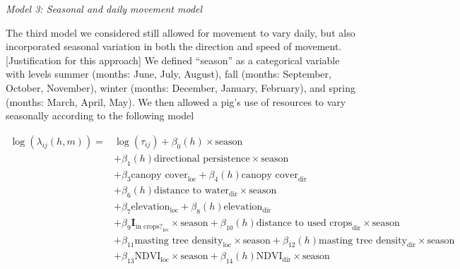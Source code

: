 \documentclass[a4paper]{article}
\begin{document}
\bigskip
\noindent
\emph{Model 3: Seasonal and daily movement model}

The third model we considered still allowed for movement to vary daily, but also incorporated seasonal variation in both the direction and speed of movement. [Justification for this approach] We defined ``season'' as a categorical variable with levels summer (months: June, July, August), fall (months: September, October, November), winter (months: December, January, February), and spring (months: March, April, May). We then allowed a pig's use of resources to vary seasonally according to the following model

\begin{align}
  \log(\lambda_{ij}(h, m)) = & \log(\tau_{ij}) + \beta_0(h) \times \text{season} \\
  & + \beta_1(h) \text{directional persistence} \times \text{season} \\
  & + \beta_{3} \text{canopy cover}_{\text{loc}} + \beta_{4}(h) \text{canopy cover}_{\text{dir}} \\
  & + \beta_6(h) \text{distance to water}_{\text{dir}} \times \text{season} \\
  & + \beta_7 \text{elevation}_{\text{loc}} + \beta_8(h) \text{elevation}_{\text{dir}} \\
  & + \beta_9\mathbf{I}_{\text{in crops?}_{\text{loc}}} \times \text{season} + \beta_{10}(h) \text{distance to used crops}_{\text{dir}} \times \text{season} \\
  & + \beta_{11} \text{masting tree density}_{\text{loc}} \times \text{season} + \beta_{12}(h) \text{masting tree density}_{\text{dir}} \times \text{season} \\
  & + \beta_{13} \text{NDVI}_{\text{loc}} \times \text{season} + \beta_{14}(h) \text{NDVI}_{\text{dir}} \times \text{season}
\end{align}
\end{document}
